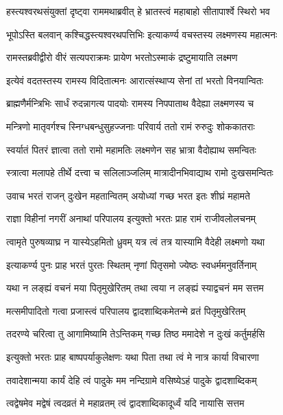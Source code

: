 \twolineshloka
{हस्त्यश्वरथसंयुक्तां दृष्ट्वा राममथाब्रवीत्}
{हे भ्रातस्त्वं महाबाहो सीतापार्श्वे स्थिरो भव} %

\twolineshloka
{भूपोऽस्ति बलवान् कश्चिद्धस्त्यश्वरथपत्तिभिः}
{इत्याकर्ण्य वचस्तस्य लक्ष्मणस्य महात्मनः} %

\twolineshloka
{रामस्तब्रवीद्वीरो वीरं सत्यपराक्रमः}
{प्रायेण भरतोऽस्माकं द्रष्टुमायाति लक्ष्मण} %

\twolineshloka
{इत्येवं वदतस्तस्य रामस्य विदितात्मनः}
{आरात्संस्थाप्य सेनां तां भरतो विनयान्वितः} %

\twolineshloka
{ब्राह्मणैर्मन्त्रिभिः सार्धं रुदन्नागत्य पादयोः}
{रामस्य निपपाताथ वैदेह्या लक्ष्मणस्य च} %

\twolineshloka
{मन्त्रिणो मातृवर्गश्च स्निग्धबन्धुसुहज्जनाः}
{परिवार्य ततो रामं रुरुदुः शोककातराः} %

\twolineshloka
{स्वर्यातं पितरं ज्ञात्वा ततो रामो महामतिः}
{लक्ष्मणेन सह भ्रात्रा वैदोह्याथ समन्वितः} %

\twolineshloka
{स्त्रात्वा मलापहे तीर्थे दत्त्वा च सलिलाञ्जलिम्}
{मात्रादीनभिवाद्याथ रामो दुःखसमन्वितः} %

\twolineshloka
{उवाच भरतं राजन् दुःखेन महतान्वितम्}
{अयोध्यां गच्छ भरत इतः शीघ्रं महामते} %

\twolineshloka
{राज्ञा विहीनां नगरीं अनाथां परिपालय}
{इत्युक्तो भरतः प्राह रामं राजीवलोलचनम्} %

\twolineshloka
{त्वामृते पुरुषव्याघ्र न यास्येऽहमितो ध्रुवम्}
{यत्र त्वं तत्र यास्यामि वैदेही लक्ष्मणो यथा} %

\twolineshloka
{इत्याकर्ण्य पुनः प्राह भरतं पुरतः स्थितम्}
{नृणां पितृसमो ज्येष्ठः स्वधर्ममनुवर्तिनाम्} %

\twolineshloka
{यथा न लङ्ह्यं वचनं मया पितृमुखेरितम्}
{तथा त्वया न लङ्ह्यं स्याद्वचनं मम सत्तम} %

\twolineshloka
{मत्समीपादितो गत्वा प्रजास्त्वं परिपालय}
{द्वादशाब्दिकमेतन्मे व्रतं पितृमुखेरितम्} %

\twolineshloka
{तदरण्ये चरित्वा तु आगामिष्यामि तेऽन्तिकम्}
{गच्छ तिष्ठ ममादेशे न दुःखं कर्तुमर्हसि} %

\twolineshloka
{इत्युक्तो भरतः प्राह बाष्पपर्याकुलेक्षणः}
{यथा पिता तथा त्वं मे नात्र कार्या विचारणा} %

\twolineshloka
{तवादेशान्मया कार्यं देहि त्वं पादुके मम}
{नन्दिग्रामे वसिष्येऽहं पादुके द्वादशाब्दिकम्} %

\twolineshloka
{त्वद्वेषमेव मद्वेषं त्वदव्रतं मे महाव्रतम्}
{त्वं द्वादशाब्दिकादूर्ध्वं यदि नायासि सत्तम} %

